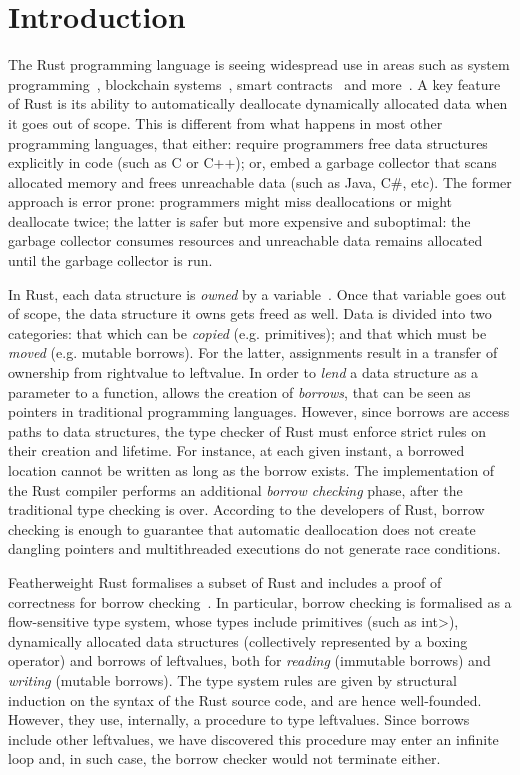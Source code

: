 \section{Introduction}\label{sec:introduction}

The Rust programming language is seeing widespread use in areas such
as system programming~\cite{ABGMMMS16,BBBPRR17,LCGPDL17}, blockchain
systems~\cite{HHHH18,NQ20}, smart contracts~\cite{Ash20,ZHCKHJJMS20}
and more~\cite{BHR18,AMPS19}.  A key feature of Rust is its ability to
automatically deallocate dynamically allocated data when it goes out
of scope. This is different from what happens in most other
programming languages, that either: require programmers free data
structures explicitly in code (such as C or C++); or, embed a garbage
collector that scans allocated memory and frees unreachable data (such
as Java, C\#, etc).  The former approach is error prone: programmers
might miss deallocations or might deallocate twice; the latter is
safer but more expensive and suboptimal: the garbage collector
consumes resources and unreachable data remains allocated until the
garbage collector is run.

In Rust, each data structure is \emph{owned} by a
variable~\cite{RustBook}. Once that variable goes out of scope, the
data structure it owns gets freed as well.  Data is divided into two
categories: that which can be {\em copied} (e.g. primitives); and that
which must be {\em moved} (e.g. mutable borrows).  For the latter,
assignments result in a transfer of ownership from rightvalue to
leftvalue.  In order to \emph{lend} a data structure as a parameter to
a function,  allows the creation of
\emph{borrows}, that can be seen as pointers in traditional
programming languages.  However, since borrows are access paths to
data structures, the type checker of Rust must enforce strict rules on
their creation and lifetime. For instance, at each given instant, a
borrowed location cannot be written as long as the borrow exists.  The
implementation of the Rust compiler performs an additional
\emph{borrow checking} phase, after the traditional type checking is
over.  According to the developers of Rust, borrow checking is enough
to guarantee that automatic deallocation does not create dangling
pointers and multithreaded executions do not generate race conditions.

Featherweight Rust formalises a subset of Rust and includes a proof of
correctness for borrow checking~\cite{Pea21}.  In particular, borrow
checking is formalised as a flow-sensitive type system, whose types
include primitives (such as \<int>), dynamically allocated data
structures (collectively represented by a boxing operator) and borrows
of leftvalues, both for {\em reading} (immutable borrows) and {\em
  writing} (mutable borrows). The type system rules are given by
structural induction on the syntax of the Rust source code, and are
hence well-founded. However, they use, internally, a procedure to type
leftvalues. Since borrows include other leftvalues, we have discovered
this procedure may enter an infinite loop and, in such case, the
borrow checker would not terminate either.

